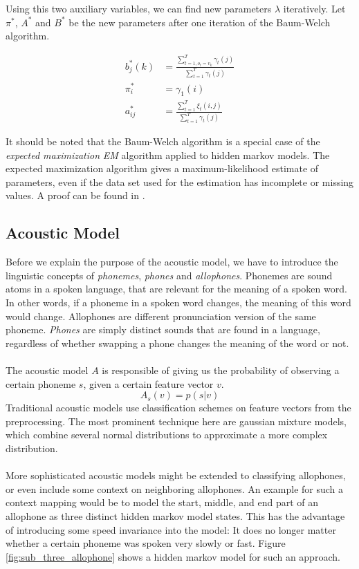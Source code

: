 Using this two auxiliary variables, we can find new parameters $\lambda$ iteratively. Let $\pi^*$, $A^*$ and $B^*$ be the new parameters after one iteration of the Baum-Welch algorithm. 

\begin{align*}
b^*_j(k) &= \frac{\sum_{t = 1, o_t = v_k}^{T} \gamma_t(j)}{\sum_{t = 1}^{T} \gamma_t(j)} \\
\pi^*_i &= \gamma_1(i) \\
a_{ij}^*  &= \frac{\sum_{t = 1}^{T} \xi_t(i, j)}{\sum_{t = 1}^{T} \gamma_t(j)} 
\end{align*}

It should be noted that the Baum-Welch algorithm is a special case of the \textit{expected maximization} {\textit{EM}} algorithm applied to hidden markov models. The expected maximization algorithm gives a maximum-likelihood estimate of parameters, even if the data set used for the estimation has incomplete or missing values. A proof can be found in \cite{bilmes1998gentle}. 

\subsection{Acoustic Model}
\label{sec:acoustic_model}
Before we explain the purpose of the acoustic model, we have to introduce the linguistic concepts of \textit{phonemes}, \textit{phones} and \textit{allophones}. Phonemes are sound atoms in a spoken language, that are relevant for the meaning of a spoken word. In other words, if a phoneme in a spoken word changes, the meaning of this word would change. Allophones are different pronunciation version of the same phoneme. \textit{Phones} are simply distinct sounds that are found in a language, regardless of whether swapping a phone changes the meaning of the word or not. \\ \\
The acoustic model $A$ is responsible of giving us the probability of observing a certain phoneme $s$, given a certain feature vector $v$. 
\[
	A_s(v) = p(s|v)
\]
Traditional acoustic models use classification schemes on feature vectors from the preprocessing. The most prominent technique here are gaussian mixture models, which combine several normal distributions to approximate a more complex distribution. \\ \\
More sophisticated acoustic models might be extended to classifying allophones, or even include some context on neighboring allophones. An example for such a context mapping would be to model the start, middle, and end part of an allophone as three distinct hidden markov model states. This has the advantage of introducing some speed invariance into the model: It does no longer matter whether a certain phoneme was spoken very slowly or fast. Figure \ref{fig:sub_three_allophone} shows a hidden markov model for such an approach. 

